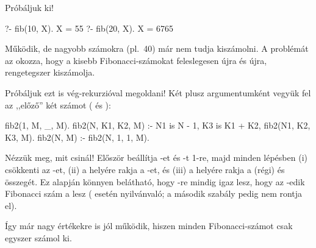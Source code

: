 Próbáljuk ki!
\begin{query}
?- fib(10, X).
X = 55
?- fib(20, X).
X = 6765
\end{query}
Működik, de nagyobb számokra (pl.~40) már nem tudja
kiszámolni. A problémát az okozza, hogy a kisebb
Fibonacci-számokat feleslegesen újra és újra,
rengetegszer kiszámolja.

Próbáljuk ezt is vég-rekurzióval megoldani! Két
plusz argumentumként vegyük fel az ,,előző'' két
számot ( és ):
\begin{program}
fib2(1, M, _, M).
fib2(N, K1, K2, M) :-
    N1 is N - 1, K3 is K1 + K2,
    fib2(N1, K2, K3, M).
fib2(N, M) :- fib2(N, 1, 1, M).
\end{program}
Nézzük meg, mit csinál! Először beállítja -et
és -t 1-re, majd minden lépésben (i)
csökkenti az -et, (ii) a  helyére rakja
a -et, és (iii) a  helyére rakja a
(régi)  és  összegét. Ez alapján
könnyen belátható, hogy -re
mindig igaz lesz, hogy az -edik Fibonacci
szám a  lesz ( esetén nyilvánvaló;
a második szabály pedig nem rontja el).

Így már nagy értékekre is jól működik, hiszen minden
Fibonacci-számot csak egyszer számol ki.

